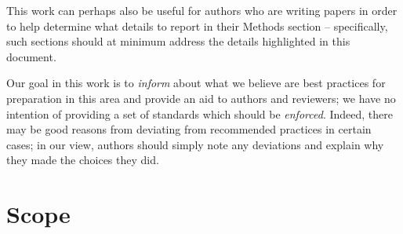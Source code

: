 \documentclass[9pt]{livecoms}
\begin{document}
This work can perhaps also be useful for authors who are writing papers in order to help determine what details to report in their Methods section -- specifically, such sections should at minimum address the details highlighted in this document. 

Our goal in this work is to \emph{inform} about what we believe are best practices for preparation in this area and provide an aid to authors and reviewers; we have no intention of providing a set of standards which should be \emph{enforced}. 
Indeed, there may be good reasons from deviating from recommended practices in certain cases; in our view, authors should simply note any deviations and explain why they made the choices they did. 

\section{Scope}
\end{document}
